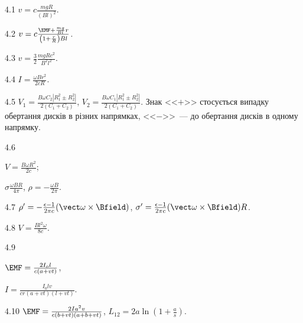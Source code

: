\protect \section *{\protect {}}
\begin{Solution}{4.{1}}
	$v = c\frac{mgR}{(Bl)^2}$.
\end{Solution}
\begin{Solution}{4.{2}}
	$v = c \frac{\EMF + \frac{mg}{Bl}r}{\left( 1 +  \frac{r}{R}\right)Bl}$.
\end{Solution}
\begin{Solution}{4.{3}}
	$v = \frac32 \frac{mgRc^2}{B^2l^2}$.
\end{Solution}
\begin{Solution}{4.{4}}
	$I = \frac{\omega B r^2}{2cR}$.
\end{Solution}
\begin{Solution}{4.{5}}
	$V_1  = \frac{B\omega C_2 \left| R_1^2 \pm R_2^2 \right| }{2(C_1 + C_2)}$, $V_2  = \frac{B\omega C_1 \left| R_1^2 \pm R_2^2 \right| }{2(C_1 + C_2)}$. Знак <<$+$>> стосується випадку обертання дисків
	в різних напрямках, <<$-$>>~--- до обертання дисків в одному напрямку.
\end{Solution}
\begin{Solution}{4.{6}}
	\begin{enumerate*}[label=\alph*)]
		\item $V = \frac{B\omega R^2}{2c}$;
		\item $\sigma \frac{\omega B R}{4\pi}$, $\rho = -\frac{\omega B}{2\pi}$.
	\end{enumerate*}
\end{Solution}
\begin{Solution}{4.{7}}
		$\rho' = -\frac{\epsilon - 1}{2\pi c} (\vect\omega\times\Bfield)$, $\sigma' = \frac{\epsilon - 1}{2\pi c} (\vect\omega\times\Bfield)R$.
\end{Solution}
\begin{Solution}{4.{8}}
	$V = \frac{Bl^2\omega}{8c}$.
\end{Solution}
\begin{Solution}{4.{9}}
	\begin{enumerate*}[label=\alph*)]
		\item $\EMF = \frac{2I_ol}{c(a+vt)}$,
		\item $I = \frac{I_0 l v}{cr(a+vt)(l+vt)}$.
	\end{enumerate*}
\end{Solution}
\begin{Solution}{4.{10}}
	$\EMF = \frac{2Ia^2v}{c(b+vt)(a+ b  +vt)}$, $L_{12} = 2a\ln \left( 1+ \frac{a}{s}\right) $.
\end{Solution}
